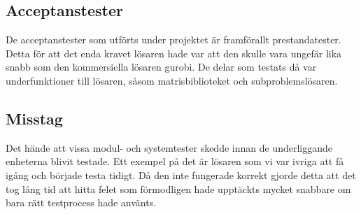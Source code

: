 	
	\subsection{Acceptanstester}
	De acceptanstester som utförts under projektet är framförallt prestandatester. Detta för att det enda kravet lösaren hade var att den skulle vara ungefär lika snabb som den kommersiella lösaren gurobi. De delar som testats då var underfunktioner till lösaren, såsom matrisbiblioteket och subproblemslösaren.
	
	\subsection{Misstag}
	Det hände att vissa modul- och systemtester skedde innan de underliggande enheterna blivit testade. Ett exempel på det är lösaren som vi var ivriga att få igång och började testa tidigt. Då den inte fungerade korrekt gjorde detta att det tog lång tid att hitta felet som förmodligen hade upptäckts mycket snabbare om bara rätt testprocess hade använts.
	
	